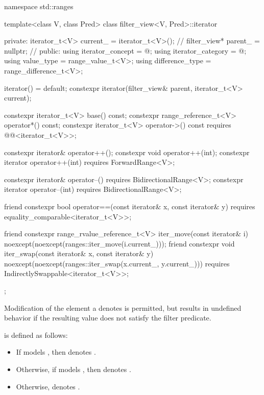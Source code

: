 %
\begin{codeblock}
namespace std::ranges {
  template<class V, class Pred>
  class filter_view<V, Pred>::iterator {
  private:
    iterator_t<V> current_ = iterator_t<V>();   // \expos
    filter_view* parent_ = nullptr;             // \expos
  public:
    using iterator_concept  = @\seebelow@;
    using iterator_category = @\seebelow@;
    using value_type        = range_value_t<V>;
    using difference_type   = range_difference_t<V>;

    iterator() = default;
    constexpr iterator(filter_view& parent, iterator_t<V> current);

    constexpr iterator_t<V> base() const;
    constexpr range_reference_t<V> operator*() const;
    constexpr iterator_t<V> operator->() const
      requires @@<iterator_t<V>>;

    constexpr iterator& operator++();
    constexpr void operator++(int);
    constexpr iterator operator++(int) requires ForwardRange<V>;

    constexpr iterator& operator--() requires BidirectionalRange<V>;
    constexpr iterator operator--(int) requires BidirectionalRange<V>;

    friend constexpr bool operator==(const iterator& x, const iterator& y)
      requires equality_comparable<iterator_t<V>>;

    friend constexpr range_rvalue_reference_t<V> iter_move(const iterator& i)
      noexcept(noexcept(ranges::iter_move(i.current_)));
    friend constexpr void iter_swap(const iterator& x, const iterator& y)
      noexcept(noexcept(ranges::iter_swap(x.current_, y.current_)))
      requires IndirectlySwappable<iterator_t<V>>;
  };
}
\end{codeblock}

\pnum
Modification of the element a  denotes is
permitted, but results in undefined behavior if the resulting value does not
satisfy the filter predicate.

\pnum
{} is defined as follows:
\begin{itemize}
\item If  models , then
 denotes .

\item Otherwise, if  models , then
 denotes .

\item Otherwise,  denotes .
\end{itemize}

